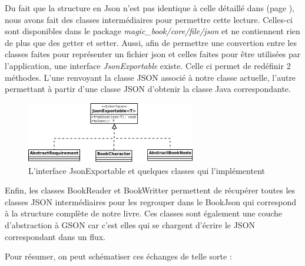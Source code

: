 			Du fait que la structure en Json n'est pas identique à celle détaillé dans  (page \pageref{sec:representation_livre}), nous avons fait des classes intermédiaires pour permettre cette lecture. Celles-ci sont disponibles dans le package \textit{magic\_book/core/file/json} et ne contiennent rien de plus que des getter et setter. Aussi, afin de permettre une convertion entre les classes faites pour représenter un fichier json et celles faites pour être utilisées par l'application, une interface \textit{JsonExportable} existe. Celle ci permet de redéfinir 2 méthodes. L'une renvoyant la classe JSON associé à notre classe actuelle, l'autre permettant à partir d'une classe JSON d'obtenir la classe Java correspondante.

			\begin{figure}[H]
				\centering\includegraphics[width=0.66\textwidth, keepaspectratio]{img/json_exportable.png}
				\caption{L'interface JsonExportable et quelques classes qui l'implémentent}
			\end{figure}

			Enfin, les classes BookReader et BookWritter permettent de récupérer toutes les classes JSON intermédiaires pour les regrouper dans le BookJson qui correspond à la structure complète de notre livre. Ces classes sont également une couche d'abstraction à GSON car c'est elles qui se chargent d'écrire le JSON correspondant dans un flux.

			Pour résumer, on peut schématiser ces échanges de telle sorte :

